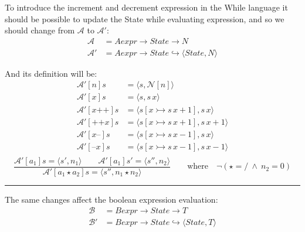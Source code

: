 \documentclass{article}
\begin{document}
To introduce the increment and decrement expression in the While language it should be possible to update the State while evaluating expression,
and so we should change from $\mathcal{A}$ to $\mathcal{A}'$:
$$ 
    \begin{aligned}
        \mathcal{A} &= Aexpr \rightarrow State \rightarrow N \\
        \mathcal{A}'&= Aexpr \rightarrow State \hookrightarrow \langle State, N\rangle
    \end{aligned}
$$

And its definition will be:
$$ 
    \begin{aligned}
        \mathcal{A}'[n]s &= \langle s, \mathcal{N}[n]\rangle \\
        \mathcal{A}'[x]s &= \langle s, s\,x \rangle \\
        \mathcal{A}'[x\texttt{++}]s &= \langle s[x\rightarrowtail s\, x +1 ], s\,x \rangle \\
        \mathcal{A}'[\texttt{++}x]s &= \langle s[x\rightarrowtail s\, x +1 ], s\,x +1 \rangle \\
        \mathcal{A}'[x\texttt{--}]s &= \langle s[x\rightarrowtail s\, x -1 ], s\,x \rangle \\
        \mathcal{A}'[\texttt{--}x]s &= \langle s[x\rightarrowtail s\, x -1 ], s\,x -1\rangle \\
    \end{aligned}
$$
$$
\frac
    {\mathcal{A}'[a_1]s = \langle s', n_1\rangle \quad\quad \mathcal{A}'[a_1]s' = \langle s'', n_2\rangle}
    {\mathcal{A}'[a_1 \star a_2]s = \langle s'', n_1 \star n_2\rangle} 
    \qquad \mathrm{where}\quad  \lnot(\star =  /\ \land\  n_2 = 0)
$$

\vspace{1em}
\hrule
\vspace{2em}

The same changes affect the boolean expression evaluation:
$$ 
    \begin{aligned}
        \mathcal{B} &= Bexpr \rightarrow State \rightarrow T \\
        \mathcal{B}'&= Bexpr \rightarrow State \hookrightarrow \langle State, T\rangle
    \end{aligned}
$$
\end{document}
